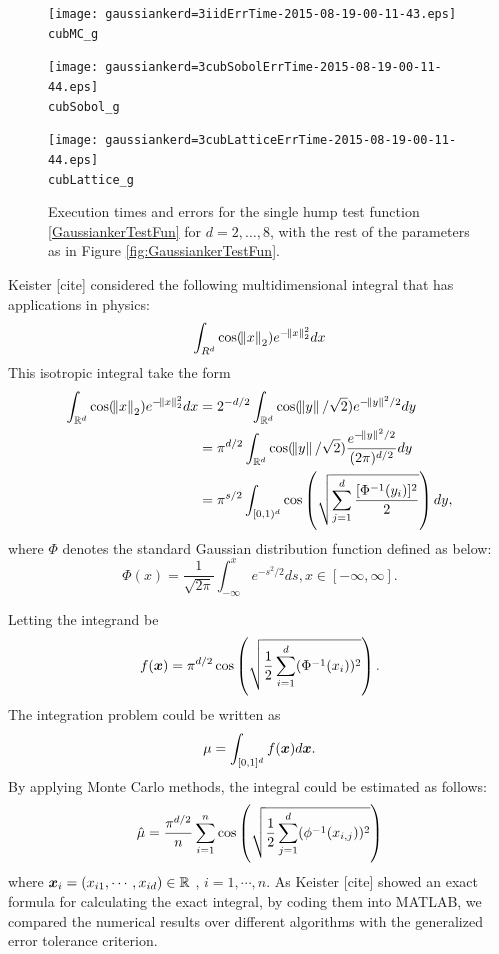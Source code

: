 \documentclass{iitthesis}
\begin{document}
\begin{figure}
\centering
\begin{minipage}{9cm} \centering \texttt{[image: gaussiankerd=3iidErrTime-2015-08-19-00-11-43.eps]} \\ {\tt cubMC\_g}  \end{minipage}
\begin{minipage}{7cm} \centering \texttt{[image: gaussiankerd=3cubSobolErrTime-2015-08-19-00-11-44.eps]} \\  {\tt cubSobol\_g}\end{minipage}
\begin{minipage}{7cm} \centering \texttt{[image: gaussiankerd=3cubLatticeErrTime-2015-08-19-00-11-44.eps]} \\ {\tt cubLattice\_g} \end{minipage}
\caption{Execution times and errors for the single hump test function \eqref{GaussiankerTestFun} for $d=2, \ldots, 8$, with the rest of the parameters as in Figure \ref{fig:GaussiankerTestFun}.\label{fig:GaussiankerHDTestFun} }
\end{figure}

Keister [cite] considered the following multidimensional integral that has applications in physics:
\begin{equation}\label{KeisterTestFun}
\int_{R^d} \cos (\norm{x}_2)e^{-\norm{x}_2^2} dx 
\end{equation}
This isotropic integral take the form
\begin{align}
 \int_{\mathbb{R}^d} \cos (\norm{x}_2)e^{-\norm{x}_2^2} dx &= 2^{-d/2}\int_{\mathbb{R}^d} \cos(\norm{y}/\sqrt{2}) e^{-\norm{y}^2/2} dy \\
&= \pi^{d/2} \int_{\mathbb{R}^d} \cos(\norm{y}/\sqrt{2}) \frac{e^{-\norm{y}^2/2}}{(2\pi)^{d/2}} dy\\
 &= \pi^{s/2} \int_{[0,1)^d} \cos \left ( \sqrt{\sum_{j=1}^d \frac{[\Phi^{-1}(y_i)]^2}{2}}\right )dy,
\end{align}
where $\Phi$ denotes the standard Gaussian distribution function defined as below:
$$\Phi(x) = \frac{1}{\sqrt{2\pi}} \int_{-\infty}^x e^{-s^2/2}ds, x \in [-\infty, \infty].$$

Letting the integrand be 
\begin{equation}
f(\boldsymbol{x}) = \pi^{d/2} \cos \left( \sqrt{\frac{1}{2} \sum_{i=1}^d (\Phi^{-1} (x_i))^2}\right).
\end{equation}
The integration problem could be written as
\begin{equation}
\mu = \int_{[0,1]^d} f(\boldsymbol{x})d\boldsymbol{x}.
\end{equation}
By applying Monte Carlo methods, the integral could be estimated as follows:
\begin{align}
\hat{\mu} = \frac{\pi^{d/2}}{n}\sum_{i=1}^n \cos \left (\sqrt{\frac12 \sum_{j=1}^d (\phi^{-1}(x_{i,j}))^2}\right )
\end{align}
where $\boldsymbol{x}_i = (x_{i1},\cdots,x_{id}) \in \mathbb{R}$ , $i=1,\cdots, n.$
As Keister [cite] showed an exact formula for calculating the exact integral, by coding them into MATLAB, we compared the numerical results over different algorithms with the generalized error tolerance criterion.
\end{document}
